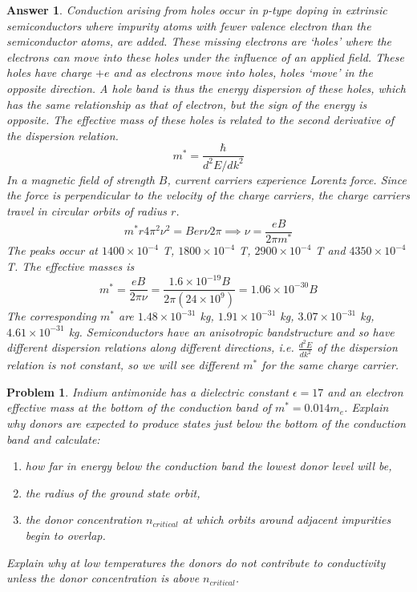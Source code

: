 \documentclass[a4paper]{article}
\newtheorem{ans}{Answer}[section]
\theoremstyle{new}
\newtheorem{qns}{Problem}[section]
\begin{document}
\begin{ans}
Conduction arising from holes occur in p-type doping in extrinsic semiconductors where impurity atoms with fewer valence electron than the semiconductor atoms, are added. These missing electrons are `holes' where the electrons can move into these holes under the influence of an applied field. These holes have charge $+e$ and as electrons move into holes, holes `move' in the opposite direction. A hole band is thus the energy dispersion of these holes, which has the same relationship as that of electron, but the sign of the energy is opposite. The effective mass of these holes is related to the second derivative of the dispersion relation. 
$$m^*=\frac{\hbar}{d^2E/dk^2}$$
In a magnetic field of strength $B$, current carriers experience Lorentz force. Since the force is perpendicular to the velocity of the charge carriers, the charge carriers travel in circular orbits of radius $r$.
$$m^*r4\pi^2\nu^2=Ber\nu 2\pi\implies \nu=\frac{eB}{2\pi m^*}$$
The peaks occur at $1400\times10^{-4}$ T, $1800\times10^{-4}$ T, $2900\times10^{-4}$ T and $4350\times10^{-4}$ T. The effective masses is
$$m^*=\frac{eB}{2\pi\nu}=\frac{1.6\times10^{-19}B}{2\pi(24\times10^9)}=1.06\times10^{-30}B$$
The corresponding $m^*$ are $1.48\times10^{-31}$ kg, $1.91\times10^{-31}$ kg, $3.07\times10^{-31}$ kg, $4.61\times10^{-31}$ kg. Semiconductors have an anisotropic bandstructure and so have different dispersion relations along different directions, i.e. $\frac{d^2E}{dk^2}$ of the dispersion relation is not constant, so we will see different $m^*$ for the same charge carrier.
\end{ans}
\newpage
\begin{qns}
Indium antimonide has a dielectric constant $\epsilon=17$ and an electron effective mass at the bottom of the conduction band of $m^*=0.014m_e$. Explain why donors are expected to produce states just below the bottom of the conduction band and calculate:
\begin{enumerate}[label=(\alph*)]
\item how far in energy below the conduction band the lowest donor level will be,
\item the radius of the ground state orbit,
\item the donor concentration $n_{critical}$ at which orbits around adjacent impurities begin to overlap.
\end{enumerate}
Explain why at low temperatures the donors do not contribute to conductivity unless the donor concentration is above $n_{critical}$.
\end{qns}
\end{document}
